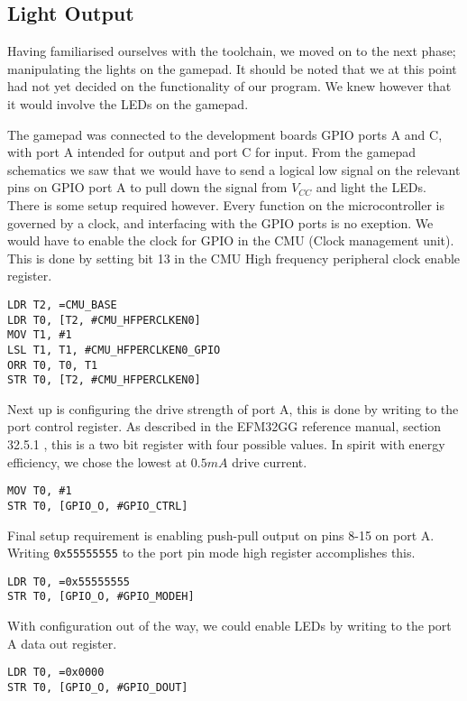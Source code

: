 \subsection{Light Output}
\label{sec:light-output}

Having familiarised ourselves with the toolchain, we moved on to the next phase; manipulating the lights on the gamepad. It should be noted that we at this point had not yet decided on the functionality of our program. We knew however that it would involve the LEDs on the gamepad.

The gamepad was connected to the development boards GPIO ports A and C, with port A intended for output and port C for input. From the gamepad schematics \cite[p.~26]{compendium} we saw that we would have to send a logical low signal on the relevant pins on GPIO port A to pull down the signal from $V_{CC}$ and light the LEDs. There is some setup required however. Every function on the microcontroller is governed by a clock, and interfacing with the GPIO ports is no exeption. We would have to enable the clock for GPIO in the CMU (Clock management unit). This is done by setting bit 13 in the CMU High frequency peripheral clock enable register.

\begin{lstlisting}[label=enable-gpio-clock,caption=Enabling GPIO clock in the CMU]
LDR T2, =CMU_BASE
LDR T0, [T2, #CMU_HFPERCLKEN0]
MOV T1, #1
LSL T1, T1, #CMU_HFPERCLKEN0_GPIO
ORR T0, T0, T1
STR T0, [T2, #CMU_HFPERCLKEN0]
\end{lstlisting}

Next up is configuring the drive strength of port A, this is done by writing to the port control register. As described in the EFM32GG reference manual, section 32.5.1 \cite{efm32ggref}, this is a two bit register with four possible values. In spirit with energy efficiency, we chose the lowest at $0.5mA$ drive current.

\begin{lstlisting}[label=set-drive-strength, caption=Set drive strength]
MOV T0, #1
STR T0, [GPIO_O, #GPIO_CTRL]
\end{lstlisting}

Final setup requirement is enabling push-pull output on pins 8-15 on port A. Writing \texttt{0x55555555} to the port pin mode high register accomplishes this. \cite[p.~767]{efm32ggref}

\begin{lstlisting}[label=enable-gpio-output, caption=Enable output]
LDR T0, =0x55555555
STR T0, [GPIO_O, #GPIO_MODEH]
\end{lstlisting}

With configuration out of the way, we could enable LEDs by writing to the port A data out register.

\begin{lstlisting}[label=enable-leds, caption=Enabling LEDs]
LDR T0, =0x0000
STR T0, [GPIO_O, #GPIO_DOUT]
\end{lstlisting}
